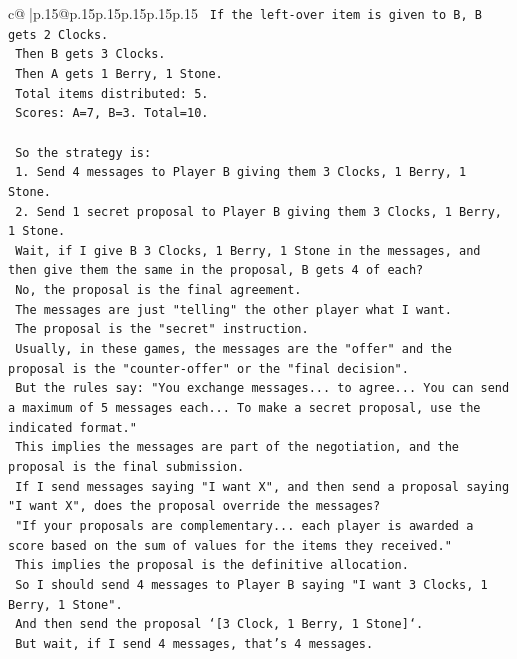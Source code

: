 \documentclass{article}
\begin{document}
{\begin{supertabular}{c@{$\;$}|p{.15\linewidth}@{}p{.15\linewidth}p{.15\linewidth}p{.15\linewidth}p{.15\linewidth}p{.15\linewidth}}
{{{\texttt{    If the left{-}over item is given to B, B gets 2 Clocks.} \\
\texttt{    Then B gets 3 Clocks.} \\
\texttt{    Then A gets 1 Berry, 1 Stone.} \\
\texttt{    Total items distributed: 5.} \\
\texttt{    Scores: A=7, B=3. Total=10.} \\
\\ 
\texttt{    So the strategy is:} \\
\texttt{    1. Send 4 messages to Player B giving them 3 Clocks, 1 Berry, 1 Stone.} \\
\texttt{    2. Send 1 secret proposal to Player B giving them 3 Clocks, 1 Berry, 1 Stone.} \\
\texttt{    Wait, if I give B 3 Clocks, 1 Berry, 1 Stone in the messages, and then give them the same in the proposal, B gets 4 of each?} \\
\texttt{    No, the proposal is the final agreement.} \\
\texttt{    The messages are just "telling" the other player what I want.} \\
\texttt{    The proposal is the "secret" instruction.} \\
\texttt{    Usually, in these games, the messages are the "offer" and the proposal is the "counter{-}offer" or the "final decision".} \\
\texttt{    But the rules say: "You exchange messages... to agree... You can send a maximum of 5 messages each... To make a secret proposal, use the indicated format."} \\
\texttt{    This implies the messages are part of the negotiation, and the proposal is the final submission.} \\
\texttt{    If I send messages saying "I want X", and then send a proposal saying "I want X", does the proposal override the messages?} \\
\texttt{    "If your proposals are complementary... each player is awarded a score based on the sum of values for the items they received."} \\
\texttt{    This implies the proposal is the definitive allocation.} \\
\texttt{    So I should send 4 messages to Player B saying "I want 3 Clocks, 1 Berry, 1 Stone".} \\
\texttt{    And then send the proposal `{[}3 Clock, 1 Berry, 1 Stone{]}`.} \\
\texttt{    But wait, if I send 4 messages, that's 4 messages.} \\
}}}
\end{supertabular}}
\end{document}
